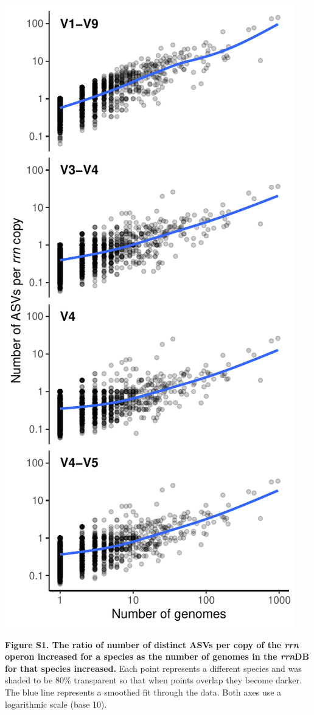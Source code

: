 \documentclass[
]{article}
\begin{document}
\newpage

\includegraphics{../figures/esv_rate.pdf}

\textbf{Figure S1. The ratio of number of distinct ASVs per copy of the
\emph{rrn} operon increased for a species as the number of genomes in
the \emph{rrn}DB for that species increased.} Each point represents a
different species and was shaded to be 80\% transparent so that when
points overlap they become darker. The blue line represents a smoothed
fit through the data. Both axes use a logarithmic scale (base 10).
\end{document}
